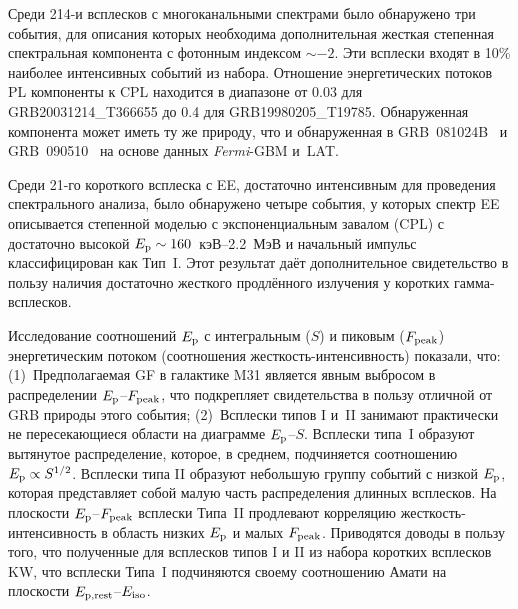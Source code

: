 \begin{enumerate}
    Среди 214-и всплесков с многоканальными спектрами было обнаружено три
    события, для описания которых необходима дополнительная жесткая степенная 
    спектральная компонента с фотонным индексом $\sim -2$. Эти всплески входят в 10\%
    наиболее интенсивных событий из набора. Отношение энергетических потоков PL
    компоненты к CPL находится в диапазоне от 0.03 для GRB20031214\_T366655 до
    0.4 для GRB19980205\_T19785. Обнаруженная компонента может иметь ту же природу,
    что и обнаруженная в GRB~081024B~\citep{Abdo_2010ApJ_712_558A} и 
    GRB~090510~\citep{Ackermann_2010ApJ_716_1178A} на основе данных \textit{Fermi}-GBM и~LAT.
    
    Среди 21-го короткого всплеска с EE, достаточно интенсивным 
    для проведения спектрального анализа, было обнаружено четыре события, у которых 
    спектр EE описывается степенной моделью с экспоненциальным завалом (CPL) 
    с достаточно высокой $E_{\mathrm{p}} \sim 160$~кэВ--2.2~МэВ и начальный импульс 
    классифицирован как Тип~I. Этот результат даёт дополнительное свидетельство 
    в пользу наличия достаточно жесткого продлённого излучения у коротких гамма-всплесков. 
    
    Исследование соотношений $E_{\mathrm{p}}$ с интегральным ($S$) и пиковым ($F_{\mathrm{peak}}$) 
    энергетическим потоком (соотношения жесткость-интенсивность) показали, что:
    (1)~Предполагаемая GF в галактике M31 является явным выбросом в распределении $E_{\mathrm{p}}$--$F_{\mathrm{peak}}$, 
    что подкрепляет свидетельства в пользу отличной от GRB природы этого события;
    (2)~Всплески типов I и~II занимают практически не пересекающиеся области на диаграмме $E_{\mathrm{p}}$--$S$.
    Всплески типа~I образуют вытянутое распределение, которое, в среднем, подчиняется 
    соотношению $E_{\mathrm{p}} \propto S^{1/2}$. Всплески типа II образуют небольшую группу событий
    с низкой $E_{\mathrm{p}}$, которая представляет собой малую часть распределения длинных всплесков.
    На плоскости $E_{\mathrm{p}}$--$F_{\mathrm{peak}}$ всплески Типа~II продлевают корреляцию 
    жесткость-интенсивность в область низких $E_{\mathrm{p}}$ и малых $F_{\mathrm{peak}}$.
    Приводятся доводы в пользу того, что полученные для всплесков типов I и II из набора коротких 
    всплесков KW,  что всплески Типа~I подчиняются 
    своему соотношению Амати на плоскости $E_{\mathrm{p,rest}}$--$E_{\mathrm{iso}}$.
  
\end{enumerate}


